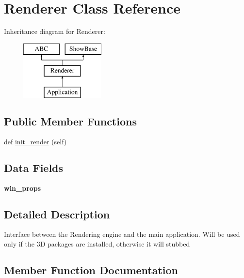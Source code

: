\hypertarget{class_rendering_1_1_renderer}{}\section{Renderer Class Reference}
\label{class_rendering_1_1_renderer}
Inheritance diagram for Renderer\+:\begin{figure}[H]
\begin{center}
\leavevmode
\includegraphics[height=3.000000cm]{class_rendering_1_1_renderer}
\end{center}
\end{figure}
\subsection*{Public Member Functions}
\begin{DoxyCompactItemize}
\item 
def \mbox{\hyperlink{class_rendering_1_1_renderer_af4c0dae777b9590cfc07035425b4d36f}{init\+\_\+render}} (self)
\end{DoxyCompactItemize}
\subsection*{Data Fields}
\begin{DoxyCompactItemize}
\item 
\mbox{\label{class_rendering_1_1_renderer_ae330d0dcd95136a19a1d2dd13470945a}} 
{\bfseries win\+\_\+props}
\end{DoxyCompactItemize}


\subsection{Detailed Description}
\begin{DoxyVerb}Interface between the Rendering engine and the main application.
Will be used only if the 3D packages are installed, otherwise it will stubbed\end{DoxyVerb}
 

\subsection{Member Function Documentation}
\mbox{\label{class_rendering_1_1_renderer_af4c0dae777b9590cfc07035425b4d36f}} 
